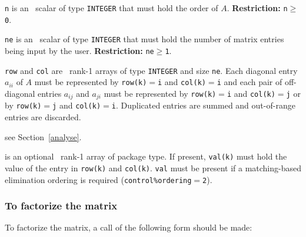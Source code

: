 \documentclass{spral}
\begin{document}
\vspace*{-3mm}
\begin{description}

\item{} {\tt n} is an \intentin\ scalar of
type  {\tt INTEGER} that must hold the order of $A$.
{\bf Restriction:} {\tt n$\geq$0}.

\item{} {\tt ne} is an \intentin\ scalar of
type  {\tt INTEGER} that must hold the number of matrix entries being input
by the user.
{\bf Restriction:} {\tt ne$\geq$1}.

\item{} {\tt row} and {\tt col} are \intentin\ rank-1 arrays of
type  {\tt INTEGER} and size {\tt ne}.
Each diagonal entry $a_{ii}$ of $A$ must be represented by
{\tt row(k)}$=${\tt i} and {\tt col(k)}$=${\tt i} and each  pair of  off-diagonal entries
 $a_{ij}$ and $a_{ji}$ must be represented by {\tt row(k)}$=${\tt i} and
 {\tt col(k)}$=${\tt j} or by {\tt row(k)}$=${\tt j} and {\tt col(k)}$=${\tt i}.
Duplicated entries are summed and out-of-range entries are discarded.

\item[\texttt{akeep{\rm ,} control{\rm ,} info{\rm ,} order{\rm :}}] see Section~\ref{analyse}.

\item[\texttt{val}] is an optional \intentin\ rank-1 array of package type.
If present,  {\tt val(k)} must hold
the value of the entry in {\tt row(k)} and {\tt col(k)}. {\tt val} must be present
if a matching-based elimination ordering is required ({\tt control\%ordering$=$2}).

\end{description}

\subsubsection{To factorize the matrix}\label{factorize}

To factorize the matrix, a call of the following form should be made:
\end{document}
